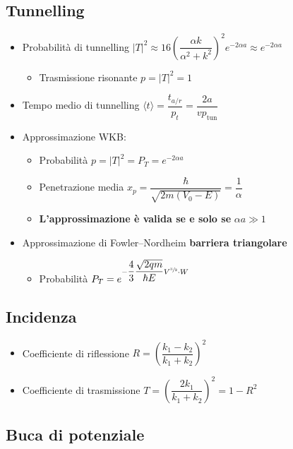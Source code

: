 \documentclass[9pt]{extarticle}
\begin{document}
\subsection{Tunnelling}
\begin{itemize}
  \item Probabilità di tunnelling \( \left| T \right| ^ 2 \approx 16 \left( \dfrac{\alpha k}{\alpha^2 + k^2} \right) ^ 2  e^{  -2 \alpha a  } \approx e^{-2 \alpha a} \)
        \begin{itemize}
          \item Trasmissione risonante \( p = |  T | ^ 2 = 1 \)
        \end{itemize}
  \item Tempo medio di tunnelling \( \langle t \rangle = \dfrac{t_{a/r}}{p_t} = \dfrac{2 a}{v p_{\text{tun}}} \)
  \item Approssimazione WKB:
        \begin{itemize}
          \item Probabilità \( p = \left| T \right| ^ 2 = P_T = e^{-2 \alpha a  } \)
          \item Penetrazione media \( x_p = \dfrac{\hbar}{\sqrt{2 m (V_0 - E)}} = \dfrac{1}{\alpha} \)
          \item \textbf{L'approssimazione è valida se e solo se} \( \alpha a \gg 1 \)
        \end{itemize}
  \item Approssimazione di Fowler–Nordheim \textbf{barriera triangolare}
        \begin{itemize}
          \item Probabilità \( P_T = e^{ - \dfrac{4}{3} \dfrac{\sqrt{2 q m}}{\hbar E} V ^ {\sfrac{3}{2}} \cdot W } \)
        \end{itemize}
\end{itemize}

\subsection{Incidenza}
\begin{itemize}
  \item Coefficiente di riflessione \( R = \left( \dfrac{k_1 - k_2}{k_1 + k_2} \right) ^ 2 \)
  \item Coefficiente di trasmissione \( T = \left( \dfrac{2 k_1}{k_1 + k_2} \right) ^ 2 = 1 - R ^ 2 \)
\end{itemize}

\subsection{Buca di potenziale}
\end{document}
